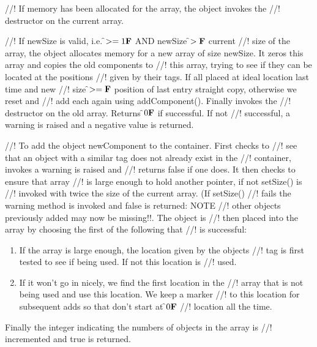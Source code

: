 //! If memory has been allocated for the array, the object invokes the
//! destructor on the current array. 

//! If \p newSize is valid, i.e. \f$>= 1{\bf F}$ AND \p newSize \f$>{\bf F}$ current
//! size of the array, the object allocates memory for a new array of size
\p newSize. It zeros this array and copies the old components to
//! this array, trying to see if they can be located at the positions
//! given by their tags. If all placed at ideal location last time and new
//! size \f$>={\bf F}$ position of last entry straight copy, otherwise we reset and
//! add each again using addComponent(). Finally invokes the
//! destructor on the old array. Returns \f$0{\bf F}$ if successful. If not
//! successful, a warning is raised and a negative value is returned. 


//! To add the object \p newComponent to the container. First checks to
//! see that an object with a similar tag does not already exist in the
//! container, invokes a warning is raised and
//! returns \p false if one does. It then checks to ensure that array
//! is large enough to hold another pointer, if not setSize() is
//! invoked with twice the size of the current array. (If setSize()
//! fails the warning method is invoked and \p false is returned: NOTE
//! other objects previously added may now be missing!!. The object is
//! then placed into the array by choosing the first of the following that
//! is successful: \begin{enumerate} 
\item If the array is large enough, the location given by the objects
//! tag is first tested to see if being used. If not this location is
//! used.
\item If it won't go in nicely, we find the first location in the
//! array that is not being used and use this location. We keep a marker
//! to this location for subsequent adds so that don't start at \f$0{\bf F}$
//! location all the time.
\end{enumerate}
\noindent Finally the integer indicating the numbers of objects in the array is
//! incremented and \p true is returned.

